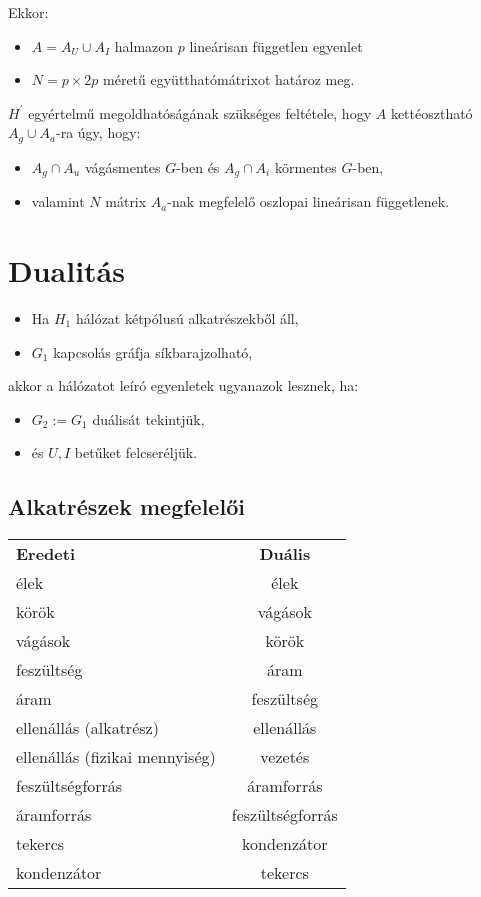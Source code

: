 \noindent
Ekkor:
\begin{itemize}
\item $A=A_{U}\cup A_{I}$ halmazon $p$ lineárisan független egyenlet
\item $N=p\times 2p$ méretű együtthatómátrixot határoz meg.
\end{itemize}

\begin{theo}
$H^{'}$ egyértelmű megoldhatóságának szükséges feltétele, hogy $A$ kettéosztható $A_{g}\cup A_{a}$-ra úgy, hogy:
\begin{itemize}
\item $A_{g}\cap A_{u}$ vágásmentes $G$-ben és $A_{g}\cap A_{i}$ körmentes $G$-ben,
\item valamint $N$ mátrix $A_{a}$-nak megfelelő oszlopai lineárisan függetlenek.
\end{itemize}
\end{theo}

\section*{Dualitás}
\begin{itemize}
\item Ha $H_{1}$ hálózat kétpólusú alkatrészekből áll,
\item $G_{1}$ kapcsolás gráfja síkbarajzolható,
\end{itemize}
akkor a hálózatot leíró egyenletek ugyanazok lesznek, ha:
\begin{itemize}
\item $G_{2}:=G_{1}$ duálisát tekintjük,
\item és $U,I$ betűket felcseréljük.
\end{itemize}

\subsection*{Alkatrészek megfelelői}

\begin{center}
\begin{tabular}{ l | c }
  \textbf{Eredeti} & \textbf{Duális} \\
  élek & élek \\
  körök & vágások \\
  vágások & körök \\
  feszültség & áram \\
  áram & feszültség \\
  ellenállás (alkatrész) & ellenállás \\
  ellenállás (fizikai mennyiség) & vezetés \\
  feszültségforrás & áramforrás \\
  áramforrás & feszültségforrás \\
  tekercs & kondenzátor \\
  kondenzátor & tekercs \\
\end{tabular}
\end{center}

